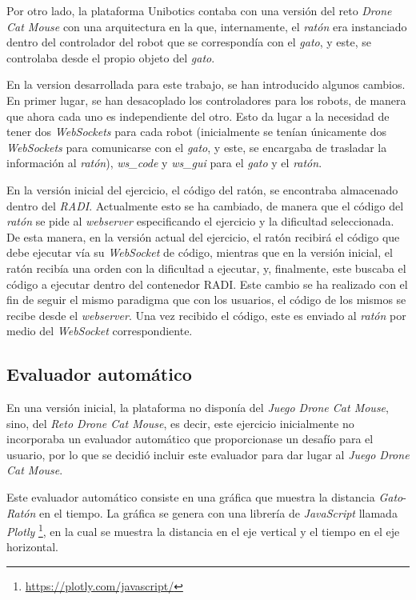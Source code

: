\documentclass[a4paper, 12pt]{book}
\begin{document}
Por otro lado, la plataforma Unibotics contaba con una versión del reto \emph{Drone Cat Mouse} con una arquitectura en la que, internamente, el \emph{ratón} era instanciado dentro del controlador del robot que se correspondía con el \emph{gato}, y este, se controlaba desde el propio objeto del \emph{gato}.

En la version desarrollada para este trabajo, se han introducido algunos cambios. En primer lugar, se han desacoplado los controladores para los robots, de manera que ahora cada uno es independiente del otro. Esto da lugar a la necesidad de tener dos \emph{WebSockets} para cada robot (inicialmente se tenían únicamente dos \emph{WebSockets} para comunicarse con el \emph{gato}, y este, se encargaba de trasladar la información al \emph{ratón}), \emph{ws\_code} y \emph{ws\_gui} para el \emph{gato} y el \emph{ratón}.

En la versión inicial del ejercicio, el código del ratón, se encontraba almacenado dentro del \emph{RADI}. Actualmente esto se ha cambiado, de manera que el código del \emph{ratón} se pide al \emph{webserver} especificando el ejercicio y la dificultad seleccionada. De esta manera, en la versión actual del ejercicio, el ratón recibirá el código que debe ejecutar vía su \emph{WebSocket} de código, mientras que en la versión inicial, el ratón recibía una orden con la dificultad a ejecutar, y, finalmente, este buscaba el código a ejecutar dentro del contenedor RADI. Este cambio se ha realizado con el fin de seguir el mismo paradigma que con los usuarios, el código de los mismos se recibe desde el \emph{webserver}. Una vez recibido el código, este es enviado al \emph{ratón} por medio del \emph{WebSocket} correspondiente.

\subsection{Evaluador automático}
\label{drone_cat_mouse_evaluator}

En una versión inicial, la plataforma no disponía del \emph{Juego Drone Cat Mouse}, sino, del \emph{Reto Drone Cat Mouse}, es decir, este ejercicio inicialmente no incorporaba un evaluador automático que proporcionase un desafío para el usuario, por lo que se decidió incluir este evaluador para dar lugar al \emph{Juego Drone Cat Mouse}. 

Este evaluador automático consiste en una gráfica que muestra la distancia \emph{Gato}-\emph{Ratón} en el tiempo. La gráfica se genera con una librería de \emph{JavaScript} llamada \emph{Plotly} \footnote{\url{https://plotly.com/javascript/}}, en la cual se muestra la distancia en el eje vertical y el tiempo en el eje horizontal.
\end{document}
